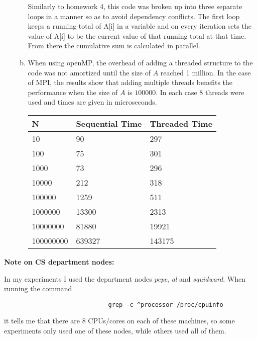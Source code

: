 \documentclass[10pt]{article} %
\begin{document}
\begin{enumerate}[1.]
\begin{enumerate}[(a)]
Similarly to homework 4, this code was broken up into three separate loops in a manner so as to avoid dependency conflicts.  The first loop keeps a running total of A[i] in a variable and on every iteration sets the value of A[i] to be the current value of that running total at that time.  From there the cumulative sum is calculated in parallel.  

\item %

When using openMP, the overhead of adding a threaded structure to the code was not amortized until the size of $A$ reached 1 million.  In the case of MPI, the results show that adding multiple threads benefits the performance when the size of $A$ is $100000$.  In each case $8$ threads were used and times are given in microseconds.  

\begin{center}
\begin{tabular}{| l | l | l |}
\hline
\textbf{N} & \textbf{Sequential Time} & \textbf{Threaded Time} \\
\hline
10 & 90 & 297 \\
100 & 75 & 301 \\
1000 & 73 & 296 \\
10000 & 212 & 318 \\
100000 & 1259 & 511 \\
1000000 & 13300 & 2313 \\
10000000 & 81880 & 19921 \\
100000000 & 639327 & 143175 \\
\hline
\end{tabular}
\end{center}

\end{enumerate}

\end{enumerate}

\textbf{Note on CS department nodes: }
\newline

In my experiments I used the department nodes \textit{pepe}, \textit{al} and \textit{squidward}.  When running the command
\begin{verbatim}
                             grep -c ^processor /proc/cpuinfo
\end{verbatim}
it tells me that there are 8 CPUs/cores on each of these machines, so some experiments only used one of these nodes, while others used all of them.  
\end{document}
